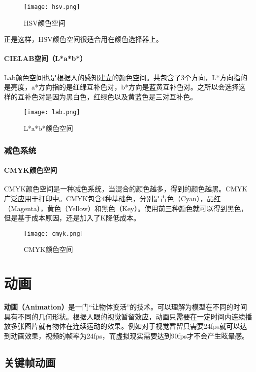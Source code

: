 \documentclass[openany]{progbookcn}
\begin{document}
\begin{figure}[H]
	\centering
	\texttt{[image: hsv.png]}
	\caption{HSV颜色空间}
	\label{fig:hsv}
\end{figure}
正是这样，HSV颜色空间很适合用在颜色选择器上。

\subsubsection{CIELAB空间（L*a*b*）}

Lab颜色空间也是根据人的感知建立的颜色空间。共包含了3个方向，L*方向指的是亮度，a*方向指的是红绿互补色对，b*方向是蓝黄互补色对。之所以会选择这样的互补色对是因为黑白色，红绿色以及黄蓝色是三对互补色。

\begin{figure}[H]
	\centering
	\texttt{[image: lab.png]}
	\caption{L*a*b*颜色空间}
	\label{fig:lab}
\end{figure}

\subsection{减色系统}

\subsubsection{CMYK颜色空间}

CMYK颜色空间是一种减色系统，当混合的颜色越多，得到的颜色越黑。CMYK广泛应用于打印中。CMYK包含4种基础色，分别是青色（Cyan），品红（Magenta），黄色（Yellow）和黑色（Key）。使用前三种颜色就可以得到黑色，但是基于成本原因，还是加入了K降低成本。

\begin{figure}[H]
	\centering
	\texttt{[image: cmyk.png]}
	\caption{CMYK颜色空间}
	\label{fig:cmyk}
\end{figure}

\chapter{动画}

\textbf{动画（Animation）}是一门``让物体变活”的技术。可以理解为模型在不同的时间具有不同的几何形状。根据人眼的视觉暂留效应，动画只需要在一定时间内连续播放多张图片就有物体在连续运动的效果。例如对于视觉暂留只需要24fps就可以达到动画效果，视频的帧率为24fps，而虚拟现实需要达到90fps才不会产生眩晕感。

\section{关键帧动画}
\end{document}
